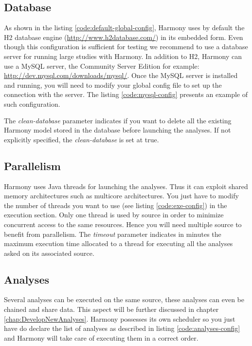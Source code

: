 		\subsection{Database}
		As shown in the listing \ref{code:default-global-config}, Harmony uses by default the H2 database engine (\url{http://www.h2database.com/}) in its embedded form. Even though this configuration is sufficient for testing we recommend to use a database server for running large studies with Harmony. In addition to H2, Harmony can use a MySQL server, the Community Server Edition for example: \url{http://dev.mysql.com/downloads/mysql/}. Once the MySQL server is installed and running, you will need to modify your global config file to set up the connection with the server. The listing \ref{code:mysql-config} presents an example of such configuration.
		

The \emph{clean-database} parameter indicates if you want to delete all the existing Harmony model stored in the database before launching the analyses. If not explicitly specified, the \emph{clean-database} is set at true.
		
		\subsection{Parallelism}
		Harmony uses Java threads for launching the analyses. Thus it can exploit shared memory architectures such as multicore architectures. You just have to modify the number of threads you want to use (see listing \ref{code:exe-config}) in the execution section. Only one thread is used by source in order to minimize concurrent access to the same resources. Hence you will need multiple source to benefit from parallelism. The \emph{timeout} parameter indicates in minutes the maximum execution time allocated to a thread for executing all the analyses asked on its associated source. 
		

		\subsection{Analyses}
		Several analyses can be executed on the same source, these analyses can even be chained and share data. This aspect will be further discussed in chapter \ref{chap:DevelopNewAnalyses}. Harmony possesses its own scheduler so you just have do declare the list of analyses as described in listing \ref{code:analyses-config} and Harmony will take care of executing them in a correct order.
		
